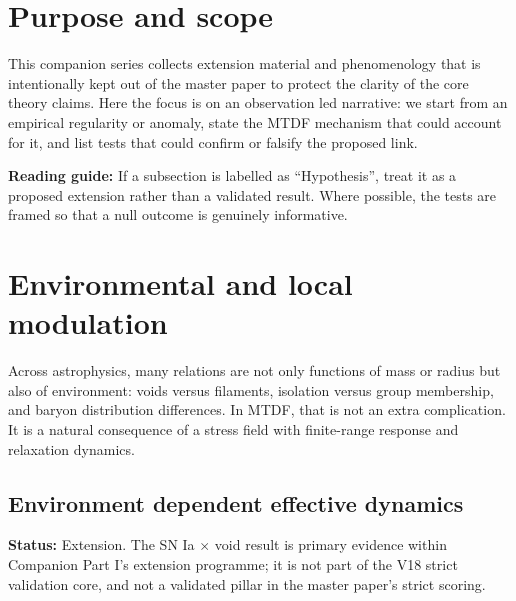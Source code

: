 \documentclass[11pt,a4paper]{article}
\begin{document}
\section{Purpose and scope}
\label{sec:purpose}
This companion series collects extension material and phenomenology that is intentionally kept out of the master paper to protect the clarity of the core theory claims.
Here the focus is on an observation led narrative: we start from an empirical regularity or anomaly, state the MTDF mechanism that could account for it, and list tests that could confirm or falsify the proposed link.

\begin{mdframed}[linecolor=accent,linewidth=0.5pt,backgroundcolor=callout-bg,leftline=true,rightline=true,topline=true,bottomline=true,innerleftmargin=8pt,innerrightmargin=8pt,innertopmargin=6pt,innerbottommargin=6pt]
\textbf{Reading guide:} If a subsection is labelled as ``Hypothesis'', treat it as a proposed extension rather than a validated result. Where possible, the tests are framed so that a null outcome is genuinely informative.
\end{mdframed}

\section{Environmental and local modulation}
\label{sec:env}
Across astrophysics, many relations are not only functions of mass or radius but also of environment: voids versus filaments, isolation versus group membership, and baryon distribution differences. In MTDF, that is not an extra complication. It is a natural consequence of a stress field with finite-range response and relaxation dynamics.

\subsection{Environment dependent effective dynamics}
\begin{mdframed}[linecolor=accent,linewidth=0.5pt,backgroundcolor=callout-bg,leftline=true,rightline=true,topline=true,bottomline=true,innerleftmargin=8pt,innerrightmargin=8pt,innertopmargin=6pt,innerbottommargin=6pt]
\textbf{Status:} Extension. The SN Ia $\times$ void result is primary evidence within Companion Part I's extension programme; it is not part of the V18 strict validation core, and not a validated pillar in the master paper's strict scoring.
\end{mdframed}
\end{document}
